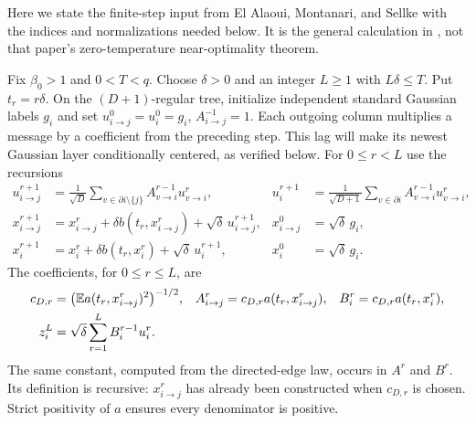 Here we state the finite-step input from El Alaoui, Montanari, and
Sellke with the indices and normalizations needed below.  It is the
general calculation in \cite[Sections~2--4.1]{EAMS2023}, not that
paper's zero-temperature near-optimality theorem.

Fix $\beta_0>1$ and $0<T<q$. Choose $\delta>0$ and an integer
$L\ge1$ with $L\delta\le T$.
Put $t_r=r\delta$.  On the $(D+1)$-regular tree, initialize independent
standard Gaussian labels $g_i$ and set
$u^0_{i\to j}=u_i^0=g_i$, $A^{-1}_{i\to j}=1$.
Each outgoing column multiplies a message by a coefficient from the
preceding step.  This lag will make its newest Gaussian layer
conditionally centered, as verified below.
For $0\le r<L$ use the recursions
\begin{align}
 u^{r+1}_{i\to j}
   &=\frac1{\sqrt D}\sum_{v\in\partial i\setminus\{j\}}
                       A^{r-1}_{v\to i}u^r_{v\to i},
 &u^{r+1}_i
   &=\frac1{\sqrt{D+1}}\sum_{v\in\partial i}
                       A^{r-1}_{v\to i}u^r_{v\to i},
 \label{eq:eams-message-recursion}\\
 x^{r+1}_{i\to j}
   &=x^r_{i\to j}+\delta b(t_r,x^r_{i\to j})
                       +\sqrt\delta\,u^{r+1}_{i\to j},
 &x^0_{i\to j}&=\sqrt\delta\,g_i,
 \label{eq:eams-cavity-euler}\\
 x^{r+1}_i
   &=x^r_i+\delta b(t_r,x^r_i)+\sqrt\delta\,u^{r+1}_i,
 &x^0_i&=\sqrt\delta\,g_i.
 \label{eq:eams-node-euler}
\end{align}
The coefficients, for $0\le r\le L$, are
\begin{align}
 c_{D,r}&=\bigl(\mathbb E a(t_r,x^r_{i\to j})^2\bigr)^{-1/2},
 &A^r_{i\to j}&=c_{D,r}a(t_r,x^r_{i\to j}),
 &B^r_i&=c_{D,r}a(t_r,x^r_i),
 \label{eq:eams-finite-normalization}\\
 z_i^L&=\sqrt\delta\sum_{r=1}^LB^{r-1}_iu_i^r.
 \label{eq:eams-output}
\end{align}
The same constant, computed from the directed-edge law, occurs in
$A^r$ and $B^r$.  Its definition is recursive: $x^r_{i\to j}$ has
already been constructed when $c_{D,r}$ is chosen.  Strict positivity
of $a$ ensures every denominator is positive.

